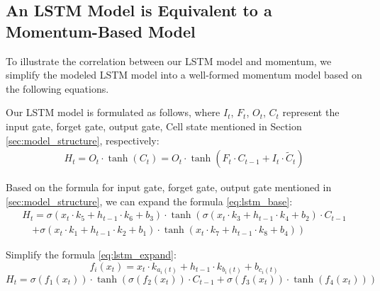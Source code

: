 
\subsection{An LSTM Model is Equivalent to a Momentum-Based Model}\label{sec:momentum_lstm}
To illustrate the correlation between our LSTM model and momentum, we simplify the modeled LSTM model into a well-formed momentum model based on the following equations.

Our LSTM model is formulated as follows, where $I_t$, $F_t$, $O_t$, $C_t$ represent the input gate, forget gate, output gate, Cell state mentioned in Section \ref{sec:model_structure}, respectively:
\begin{equation}
\begin{gathered}
    H_{t} = O_{t} \cdot \tanh(C_{t}) = O_{t} \cdot \tanh\left(F_{t} \cdot C_{t-1} + I_{t} \cdot \tilde C_{t}\right) \label{eq:lstm_base}
\end{gathered}
\end{equation}

Based on the formula for input gate, forget gate, output gate mentioned in \ref{sec:model_structure}, we can expand the formula \ref{eq:lstm_base}:
\begin{equation}
\begin{gathered}
    H_{t} = \sigma(x_{t} \cdot k_{5} + h_{t-1} \cdot k_{6} + b_{3}) \cdot \tanh\left(\sigma(x_{t} \cdot k_{3} + h_{t-1} \cdot k_{4} + b_{2}) \cdot C_{t-1} \right.\\
    \quad \left. + \sigma(x_{t} \cdot k_{1} + h_{t-1} \cdot k_{2} + b_{1}) \cdot \tanh\left(x_{t} \cdot k_{7} + h_{t-1} \cdot k_{8} + b_{4}\right)\right)\label{eq:lstm_expand}
\end{gathered}
\end{equation}

Simplify the formula \ref{eq:lstm_expand}:
\begin{equation}
f_{i}(x_{t}) = x_{t}\cdot k_{a_{i}(t)} + h_{t-1} \cdot k_{b_{i}(t)} + b_{c_{i}(t)}
\end{equation}
\begin{equation}H_{t} = \sigma\left( f_{1}(x_{t}) \right) \cdot \tanh\left( \sigma(f_{2}(x_{t})) \cdot C_{t-1} + \sigma(f_{3}(x_{t})) \cdot \tanh(f_{4}(x_{t})) \right)\label{eq:lstm_simply}
\end{equation}

